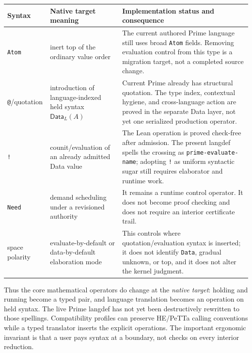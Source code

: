 \documentclass[11pt]{article}
\newcommand{\code}[1]{\texttt{#1}}
\begin{document}
\begin{longtable}{@{}>{\raggedright\arraybackslash}p{}
                       >{\raggedright\arraybackslash}p{}
                       >{\raggedright\arraybackslash}p{}@{}}
\toprule
\textbf{Syntax} & \textbf{Native target meaning} &
\textbf{Implementation status and consequence} \\
\midrule
\code{Atom} & inert top of the ordinary value order & The current authored
Prime language still uses broad \code{Atom} fields.  Removing evaluation control
from this type is a migration target, not a completed source change. \\
\code{@}/quotation & introduction of language-indexed held syntax
$\mathsf{Data}_L(A)$ & Current Prime already has structural quotation.  The type
index, contextual hygiene, and cross-language action are proved in the separate
Data layer, not yet one serialized production operator. \\
\code{!} & counit/evaluation of an already admitted Data value & The Lean
operation is proved check-free after admission.  The present langdef spells the
crossing as \code{prime-evaluate-name}; adopting \code{!} as uniform syntactic sugar
still requires elaborator and runtime work. \\
\code{Need} & demand scheduling under a revisioned authority & It remains a
runtime control operator.  It does not become proof checking and does not require
an interior certificate trail. \\
space polarity & evaluate-by-default or data-by-default elaboration mode & This
controls where quotation/evaluation syntax is inserted; it does not identify
\code{Data}, gradual unknown, or top, and it does not alter the kernel judgment. \\
\bottomrule
\end{longtable}

Thus the core mathematical operators do change at the \emph{native target}:
holding and running become a typed pair, and language translation becomes an
operation on held syntax.  The live Prime langdef has not yet been destructively
rewritten to those spellings.  Compatibility profiles can preserve HE/PeTTa
calling conventions while a typed translator inserts the explicit operations.
The important ergonomic invariant is that a user pays syntax at a boundary, not
checks on every interior reduction.
\end{document}
